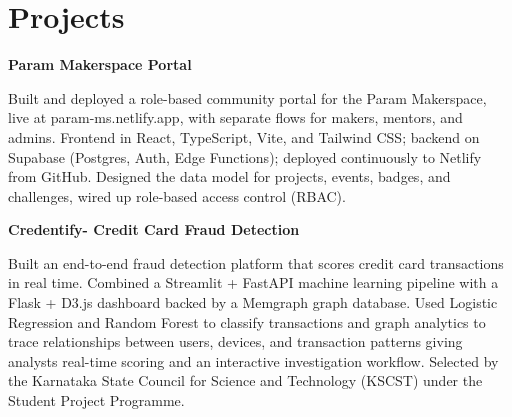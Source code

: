     \section{Projects}
        \begin{twocolentry}{
        }
            \textbf{Param Makerspace Portal}
        \end{twocolentry}
        \vspace{0.10 cm}
        \begin{onecolentry}
            \begin{highlights}
                \item Built and deployed a role-based community portal for the Param Makerspace, live at param-ms.netlify.app, with separate flows for makers, mentors, and admins. Frontend in React, TypeScript, Vite, and Tailwind CSS; backend on Supabase (Postgres, Auth, Edge Functions); deployed continuously to Netlify from GitHub. Designed the data model for projects, events, badges, and challenges, wired up role-based access control (RBAC).
            \end{highlights}
        \end{onecolentry}
        \vspace{0.2 cm}
        \begin{twocolentry}{
        }
            \textbf{Credentify- Credit Card Fraud Detection}
        \end{twocolentry}
        \vspace{0.10 cm}
        \begin{onecolentry}
            \begin{highlights}
                \item Built an end-to-end fraud detection platform that scores credit card transactions in real time. Combined a Streamlit + FastAPI machine learning pipeline with a Flask + D3.js dashboard backed by a Memgraph graph database. Used Logistic Regression and Random Forest to classify transactions and graph analytics to trace relationships between users, devices, and transaction patterns giving analysts real-time scoring and an interactive investigation workflow. Selected by the Karnataka State Council for Science and Technology (KSCST) under the Student Project Programme.
            \end{highlights}
        \end{onecolentry}
        \vspace{0.2 cm}
